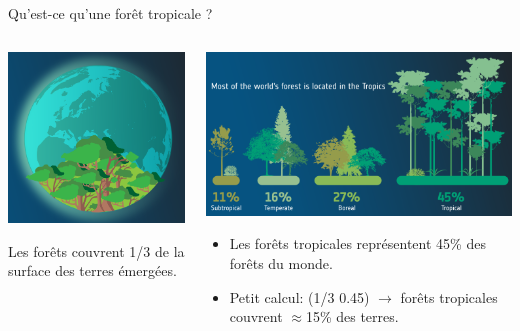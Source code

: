 \documentclass[10pt,table,dvipsnames,compress]{beamer}
\begin{document}
\begin{frame}[label={sec:orge02dbd1}]{Qu'est-ce qu'une forêt tropicale ?}
\begin{columns}
\begin{column}{0.3\columnwidth}
\begin{center}
\includegraphics[width=\textwidth]{figs/forest-one-third-of-earth-land.png}
\end{center}
Les forêts couvrent 1/3 de la surface des terres émergées.
\end{column}
\begin{column}{0.7\columnwidth}
\begin{center}
\includegraphics[width=\textwidth]{figs/45-percent-of-forest-cover-in-the-tropics.png}
\end{center}
\begin{itemize}
\item Les forêts tropicales représentent 45\% des forêts du monde.
\item Petit calcul: (1/3 \texttimes{} 0.45) \(\rightarrow\) forêts tropicales couvrent \(\approx\)15\% des terres.
\end{itemize}
\end{column}
\end{columns}
\end{frame}
\end{document}
